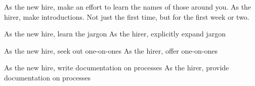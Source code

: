 

As the new hire, make an effort to learn the names of those around you.
As the hirer, make introductions. Not just the first time, but for the first week or two.


As the new hire, learn the jargon
As the hirer, explicitly expand jargon


As the new hire, seek out one-on-ones
As the hirer, offer one-on-ones


As the new hire, write documentation on processes
As the hirer, provide documentation on processes